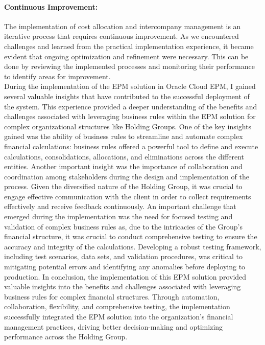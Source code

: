 \documentclass[12pt,a4paper,openright,twoside]{book}
\begin{document}
\paragraph{Continuous Improvement:}
The implementation of cost allocation and intercompany management is an iterative process that requires continuous improvement. 
%
As we encountered challenges and learned from the practical implementation experience, it became evident that ongoing optimization and refinement were necessary. 
%
This can be done by reviewing the implemented processes and monitoring their performance to identify areas for improvement. \\

During the implementation of the EPM solution in Oracle Cloud EPM, I gained several valuable insights that have contributed to the successful deployment of the system.
%
This experience provided a deeper understanding of the benefits and challenges associated with leveraging business rules within the EPM solution for complex organizational structures like Holding Groups.
%
One of the key insights gained was the ability of business rules to streamline and automate complex financial calculations: business rules offered a powerful tool to define and execute calculations, consolidations, allocations, and eliminations across the different entities. 
%
Another important insight was the importance of collaboration and coordination among stakeholders during the design and implementation of the process. 
%
Given the diversified nature of the Holding Group, it was crucial to engage effective communication with the client in order to collect requirements effectively and receive feedback continuously.
%
An important challenge that emerged during the implementation was the need for focused testing and validation of complex business rules as, due to the intricacies of the Group's financial structure, it was crucial to conduct comprehensive testing to ensure the accuracy and integrity of the calculations. 
%
Developing a robust testing framework, including test scenarios, data sets, and validation procedures, was critical to mitigating potential errors and identifying any anomalies before deploying to production.
%
In conclusion, the implementation of this EPM solution provided valuable insights into the benefits and challenges associated with leveraging business rules for complex financial structures. 
%
Through automation, collaboration, flexibility, and comprehensive testing, the implementation successfully integrated the EPM solution into the organization's financial management practices, driving better decision-making and optimizing performance across the Holding Group.
\end{document}
